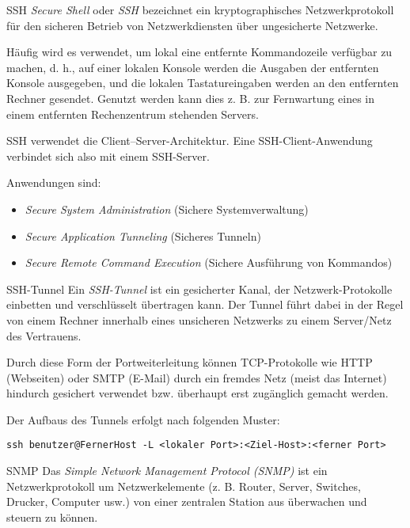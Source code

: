 \begin{defi}{SSH}
    \emph{Secure Shell} oder \emph{SSH} bezeichnet ein kryptographisches Netzwerkprotokoll für den sicheren Betrieb von Netzwerkdiensten über ungesicherte Netzwerke.

    Häufig wird es verwendet, um lokal eine entfernte Kommandozeile verfügbar zu machen, d. h., auf einer lokalen Konsole werden die Ausgaben der entfernten Konsole ausgegeben, und die lokalen Tastatureingaben werden an den entfernten Rechner gesendet.
    Genutzt werden kann dies z. B. zur Fernwartung eines in einem entfernten Rechenzentrum stehenden Servers.

    SSH verwendet die Client–Server-Architektur. Eine SSH-Client-Anwendung verbindet sich also mit einem SSH-Server.

    Anwendungen sind:
    \begin{itemize}
        \item \emph{Secure System Administration} (Sichere Systemverwaltung)
        \item \emph{Secure Application Tunneling} (Sicheres Tunneln)
        \item \emph{Secure Remote Command Execution} (Sichere Ausführung von Kommandos)
    \end{itemize}
\end{defi}

\begin{bonus}{SSH-Tunnel}
    Ein \emph{SSH-Tunnel} ist ein gesicherter Kanal, der Netzwerk-Protokolle einbetten und verschlüsselt übertragen kann. Der Tunnel führt dabei in der Regel von einem Rechner innerhalb eines unsicheren Netzwerks zu einem Server/Netz des Vertrauens.

    Durch diese Form der Portweiterleitung können TCP-Protokolle wie HTTP (Webseiten) oder SMTP (E-Mail) durch ein fremdes Netz (meist das Internet) hindurch gesichert verwendet bzw. überhaupt erst zugänglich gemacht werden.

    Der Aufbaus des Tunnels erfolgt nach folgenden Muster:

    \centering
    \texttt{ssh benutzer@FernerHost -L <lokaler Port>:<Ziel-Host>:<ferner Port>}
\end{bonus}

\begin{bonus}{SNMP}
    Das \emph{Simple Network Management Protocol (SNMP)}  ist ein Netzwerkprotokoll um Netzwerkelemente (z. B. Router, Server, Switches, Drucker, Computer usw.) von einer zentralen Station aus überwachen und steuern zu können.
\end{bonus}